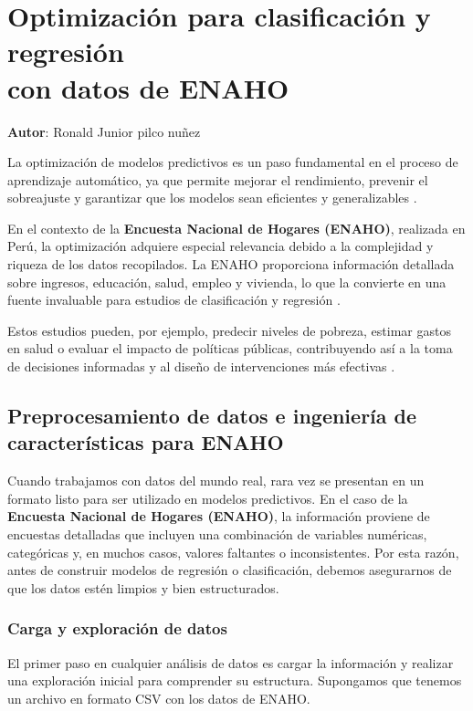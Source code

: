 \documentclass{book}
\begin{document}
	
	\chapter{Optimización para clasificación y regresión \\ con datos de ENAHO}
	\textbf{Autor}: \large{Ronald Junior pilco nuñez}
	\label{chap:8}
	
	\vspace{1cm}
	
La optimización de modelos predictivos es un paso fundamental en el proceso de aprendizaje automático, ya que permite mejorar el rendimiento, prevenir el sobreajuste y garantizar que los modelos sean eficientes y generalizables \cite{1}. 

En el contexto de la \textbf{Encuesta Nacional de Hogares (ENAHO)}, realizada en Perú, la optimización adquiere especial relevancia debido a la complejidad y riqueza de los datos recopilados. La ENAHO proporciona información detallada sobre ingresos, educación, salud, empleo y vivienda, lo que la convierte en una fuente invaluable para estudios de clasificación y regresión \cite{2}. 

Estos estudios pueden, por ejemplo, predecir niveles de pobreza, estimar gastos en salud o evaluar el impacto de políticas públicas, contribuyendo así a la toma de decisiones informadas y al diseño de intervenciones más efectivas \cite{3}.

	
	\section{Preprocesamiento de datos e ingeniería de características para ENAHO}
	
	Cuando trabajamos con datos del mundo real, rara vez se presentan en un formato listo para ser utilizado en modelos predictivos. En el caso de la \textbf{Encuesta Nacional de Hogares (ENAHO)}, la información proviene de encuestas detalladas que incluyen una combinación de variables numéricas, categóricas y, en muchos casos, valores faltantes o inconsistentes. Por esta razón, antes de construir modelos de regresión o clasificación, debemos asegurarnos de que los datos estén limpios y bien estructurados.
	
	\subsection{Carga y exploración de datos}
	
	El primer paso en cualquier análisis de datos es cargar la información y realizar una exploración inicial para comprender su estructura. Supongamos que tenemos un archivo en formato CSV con los datos de ENAHO.
	
\end{document}
